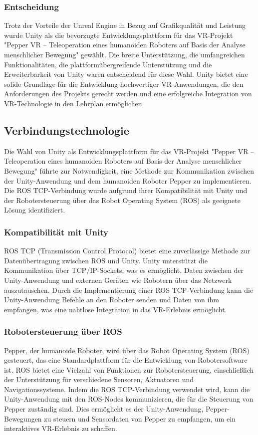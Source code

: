 \subsubsection{Entscheidung}

Trotz der Vorteile der Unreal Engine in Bezug auf Grafikqualität und Leistung wurde Unity als die bevorzugte Entwicklungsplattform für das VR-Projekt "Pepper VR – Teleoperation eines humanoiden Roboters auf Basis der Analyse menschlicher Bewegung" gewählt. Die breite Unterstützung, die umfangreichen Funktionalitäten, die plattformübergreifende Unterstützung und die Erweiterbarkeit von Unity waren entscheidend für diese Wahl. Unity bietet eine solide Grundlage für die Entwicklung hochwertiger VR-Anwendungen, die den Anforderungen des Projekts gerecht werden und eine erfolgreiche Integration von VR-Technologie in den Lehrplan ermöglichen.
\subsection{Verbindungstechnologie}
Die Wahl von Unity als Entwicklungsplattform für das VR-Projekt "Pepper VR – Teleoperation eines humanoiden Roboters auf Basis der Analyse menschlicher Bewegung" führte zur Notwendigkeit, eine Methode zur Kommunikation zwischen der Unity-Anwendung und dem humanoiden Roboter Pepper zu implementieren. Die ROS TCP-Verbindung wurde aufgrund ihrer Kompatibilität mit Unity und der Robotersteuerung über das Robot Operating System (ROS) als geeignete Lösung identifiziert.

\subsubsection{Kompatibilität mit Unity}

ROS TCP (Transmission Control Protocol) bietet eine zuverlässige Methode zur Datenübertragung zwischen ROS und Unity. Unity unterstützt die Kommunikation über TCP/IP-Sockets, was es ermöglicht, Daten zwischen der Unity-Anwendung und externen Geräten wie Robotern über das Netzwerk auszutauschen. Durch die Implementierung einer ROS TCP-Verbindung kann die Unity-Anwendung Befehle an den Roboter senden und Daten von ihm empfangen, was eine nahtlose Integration in das VR-Erlebnis ermöglicht.

\subsubsection{Robotersteuerung über ROS}

Pepper, der humanoide Roboter, wird über das Robot Operating System (ROS) gesteuert, das eine Standardplattform für die Entwicklung von Robotersoftware ist. ROS bietet eine Vielzahl von Funktionen zur Robotersteuerung, einschließlich der Unterstützung für verschiedene Sensoren, Aktuatoren und Navigationssysteme. Indem die ROS TCP-Verbindung verwendet wird, kann die Unity-Anwendung mit den ROS-Nodes kommunizieren, die für die Steuerung von Pepper zuständig sind. Dies ermöglicht es der Unity-Anwendung, Pepper-Bewegungen zu steuern und Sensordaten von Pepper zu empfangen, um ein interaktives VR-Erlebnis zu schaffen.

